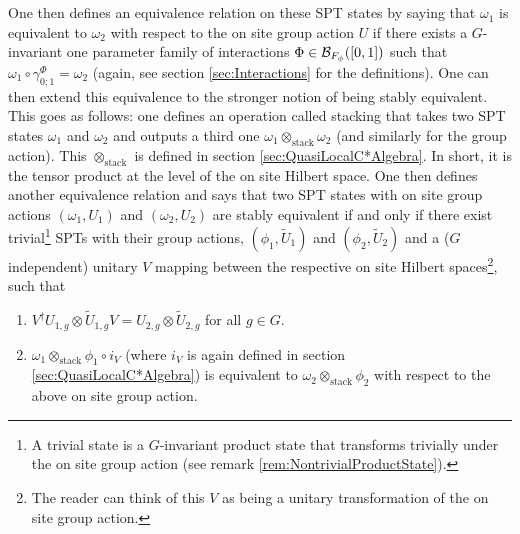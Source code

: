 \documentclass[11pt,a4paper,twoside]{article}
\numberwithin{equation}{section}
\begin{document}
\\\\
One then defines an equivalence relation on these SPT states by saying that $\omega_1$ is equivalent to $\omega_2$ with respect to the on site group action $U$ if there exists a $G$-invariant one parameter family of interactions $\Phi\in\mathcal B_{F_\phi}([0,1])$ such that $\omega_1\circ\gamma^\Phi_{0;1}=\omega_2$ (again, see section \ref{sec:Interactions} for the definitions). One can then extend this equivalence to the stronger notion of being stably equivalent. This goes as follows: one defines an operation called stacking that takes two SPT states $\omega_1$ and $\omega_2$ and outputs a third one $\omega_1\otimes_{\text{stack}}\omega_2$ (and similarly for the group action). This $\otimes_\text{stack}$ is defined in section \ref{sec:QuasiLocalC*Algebra}. In short, it is the tensor product at the level of the on site Hilbert space. One then defines another equivalence relation and says that two SPT states with on site group actions $(\omega_1,U_1)$ and $(\omega_2,U_2)$ are stably equivalent if and only if there exist trivial\footnote{A trivial state is a $G$-invariant product state that transforms trivially under the on site group action (see remark \ref{rem:NontrivialProductState}).} SPTs with their group actions, $(\phi_1,\tilde{U}_1)$ and $(\phi_2,\tilde{U}_2)$ and a ($G$ independent) unitary $V$ mapping between the respective on site Hilbert spaces\footnote{The reader can think of this $V$ as being a unitary transformation of the on site group action.}, such that
\begin{enumerate}
	\item $V^\dagger U_{1,g}\otimes \tilde{U}_{1,g}V=U_{2,g}\otimes \tilde{U}_{2,g}$ for all $g\in G$.
	\item $\omega_1\otimes_{\text{stack}}\phi_1\circ i_V$ (where $i_V$ is again defined in section \ref{sec:QuasiLocalC*Algebra}) is equivalent to $\omega_2\otimes_{\text{stack}}\phi_2$ with respect to the above on site group action.
\end{enumerate}
\end{document}
